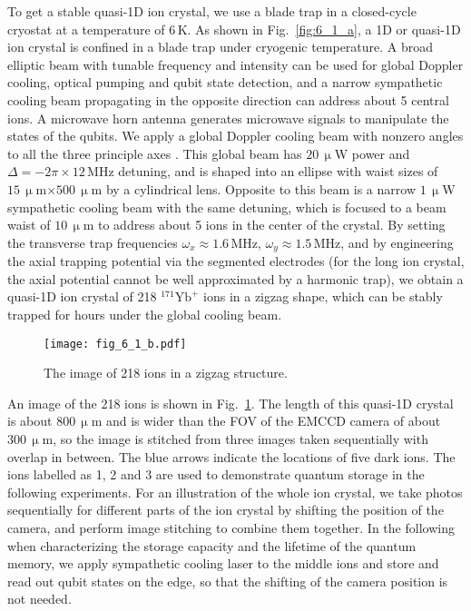 To get a stable quasi-1D ion crystal, we use a blade trap in a closed-cycle cryostat \cite{pagano2018cryogenic} at a temperature of $6\,$K. As shown in Fig.~\ref{fig:6_1_a}, a 1D or quasi-1D ion crystal is confined in a blade trap under cryogenic temperature. A broad elliptic beam with tunable frequency and intensity can be used for global Doppler cooling, optical pumping and qubit state detection, and a narrow sympathetic cooling beam propagating in the opposite direction can address about 5 central ions. A microwave horn antenna generates microwave signals to manipulate the states of the qubits. We apply a global Doppler cooling beam with nonzero angles to all the three principle axes \cite{RN217, RN106}. This global beam has $20\,\upmu$W power and $\Delta=-2\pi\times 12\,$MHz detuning, and is shaped into an ellipse with waist sizes of $15\,\upmu$m$\times 500\,\upmu$m by a cylindrical lens. Opposite to this beam is a narrow $1\,\upmu$W sympathetic cooling beam with the same detuning, which is focused to a beam waist of $10\,\upmu$m to address about 5 ions in the center of the crystal. By setting the transverse trap frequencies $\omega_x\approx 1.6\,$MHz, $\omega_y\approx 1.5\,$MHz, and by engineering the axial trapping potential via the segmented electrodes (for the long ion crystal, the axial potential cannot be well approximated by a harmonic trap), we obtain a quasi-1D ion crystal of 218 $^{171}\mathrm{Yb}^+$ ions in a zigzag shape, which can be stably trapped for hours under the global cooling beam.

\begin{figure}
    \centering
    \texttt{[image: fig\_6\_1\_b.pdf]}
    \caption{The image of 218 ions in a zigzag structure.}
    \label{fig:6_1_b}
\end{figure}

An image of the 218 ions is shown in Fig.~\ref{fig:6_1_b}. The length of this quasi-1D crystal is about $800\,\upmu$m and is wider than the FOV of the EMCCD camera of about $300\,\upmu$m, so the image is stitched from three images taken sequentially with overlap in between. The blue arrows indicate the locations of five dark ions. The ions labelled as 1, 2 and 3 are used to demonstrate quantum storage in the following experiments. For an illustration of the whole ion crystal, we take photos sequentially for different parts of the ion crystal by shifting the position of the camera, and perform image stitching to combine them together. In the following when characterizing the storage capacity and the lifetime of the quantum memory, we apply sympathetic cooling laser to the middle ions \cite{mao2021experimental} and store and read out qubit states on the edge, so that the shifting of the camera position is not needed.



